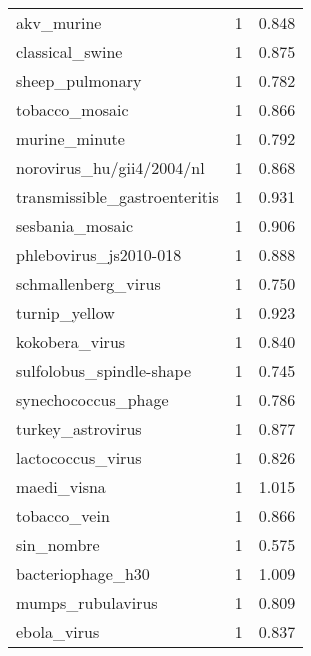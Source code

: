 \begin{tabular}{lrr}
                               akv\_murine &                   1 &     0.848 \\
                          classical\_swine &                   1 &     0.875 \\
                          sheep\_pulmonary &                   1 &     0.782 \\
                           tobacco\_mosaic &                   1 &     0.866 \\
                            murine\_minute &                   1 &     0.792 \\
                norovirus\_hu/gii4/2004/nl &                   1 &     0.868 \\
            transmissible\_gastroenteritis &                   1 &     0.931 \\
                          sesbania\_mosaic &                   1 &     0.906 \\
                   phlebovirus\_js2010-018 &                   1 &     0.888 \\
                      schmallenberg\_virus &                   1 &     0.750 \\
                            turnip\_yellow &                   1 &     0.923 \\
                           kokobera\_virus &                   1 &     0.840 \\
                 sulfolobus\_spindle-shape &                   1 &     0.745 \\
                      synechococcus\_phage &                   1 &     0.786 \\
                        turkey\_astrovirus &                   1 &     0.877 \\
                        lactococcus\_virus &                   1 &     0.826 \\
                              maedi\_visna &                   1 &     1.015 \\
                             tobacco\_vein &                   1 &     0.866 \\
                               sin\_nombre &                   1 &     0.575 \\
                        bacteriophage\_h30 &                   1 &     1.009 \\
                        mumps\_rubulavirus &                   1 &     0.809 \\
                              ebola\_virus &                   1 &     0.837 \\

\end{tabular}
